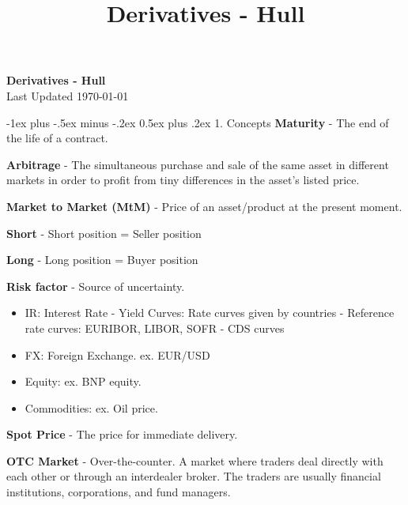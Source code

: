 \documentclass[10pt,landscape]{article}
\title{Derivatives - Hull}
\makeatletter
\renewcommand{\section}{\@startsection{section}{1}{0mm}%
                                {-1ex plus -.5ex minus -.2ex}%
                                {0.5ex plus .2ex}%
                                {\normalfont\large\bfseries}}
\makeatother
\begin{document}
\raggedright
\footnotesize

\begin{center}
    \vspace{-50mm}
    \Large{\vspace{-15mm}\textbf{Derivatives - Hull}} \\
    \footnotesize{Last Updated \today}
    \vspace{-.4mm}
\end{center}
\begin{multicols}{3}
    \setlength{\premulticols}{1pt}
    \setlength{\postmulticols}{1pt}
    \setlength{\multicolsep}{1pt}
    \setlength{\columnsep}{2pt}
    \section{1. Concepts}
    \textbf{Maturity} - The end of the life of a contract.

    \textbf{Arbitrage} - The simultaneous purchase and sale of the same asset in different markets in order to profit from tiny differences in the asset's listed price.

    \textbf{Market to Market (MtM)} - Price of an asset/product at the present moment.
    
    \textbf{Short} - Short position = Seller position
    
    \textbf{Long} - Long position = Buyer position
    
    \textbf{Risk factor} - Source of uncertainty.
    \begin{itemize}[label={--},leftmargin=4mm]
        \vspace{-1mm}
        \itemsep -.4mm
        \item IR: Interest Rate
            \subitem - Yield Curves: Rate curves given by countries
            \subitem - Reference rate curves: EURIBOR, LIBOR, SOFR
            \subitem - CDS curves
        \item FX: Foreign Exchange. ex. EUR/USD
        \item Equity: ex. BNP equity.
        \item Commodities: ex. Oil price.

    \end{itemize}

    \textbf{Spot Price} - The price for immediate delivery.
    
    \textbf{OTC Market} - Over-the-counter. A market where traders deal directly with each other or through an interdealer broker. The traders are usually financial institutions, corporations, and fund managers.
    

\end{multicols}
\end{document}
